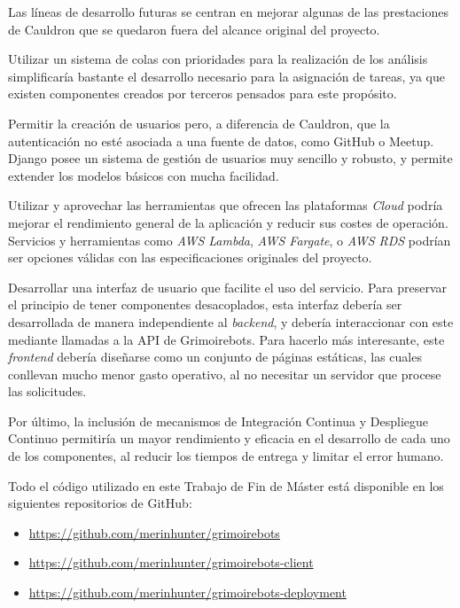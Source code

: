 Las líneas de desarrollo futuras se centran en mejorar algunas de las prestaciones de Cauldron que se quedaron fuera del alcance original del proyecto.

Utilizar un sistema de colas con prioridades para la realización de los análisis simplificaría bastante el desarrollo necesario para la asignación de tareas, ya que existen componentes creados por terceros pensados para este propósito.

Permitir la creación de usuarios pero, a diferencia de Cauldron, que la autenticación no esté asociada a una fuente de datos, como GitHub o Meetup. Django posee un sistema de gestión de usuarios muy sencillo y robusto, y permite extender los modelos básicos con mucha facilidad.

Utilizar y aprovechar las herramientas que ofrecen las plataformas \emph{Cloud} podría mejorar el rendimiento general de la aplicación y reducir sus costes de operación. Servicios y herramientas como \emph{AWS Lambda}, \emph{AWS Fargate}, o \emph{AWS RDS} podrían ser opciones válidas con las especificaciones originales del proyecto.

Desarrollar una interfaz de usuario que facilite el uso del servicio. Para preservar el principio de tener componentes desacoplados, esta interfaz debería ser desarrollada de manera independiente al \emph{backend}, y debería interaccionar con este mediante llamadas a la API\index{} de Grimoirebots. Para hacerlo más interesante, este \emph{frontend} debería diseñarse como un conjunto de páginas estáticas, las cuales conllevan mucho menor gasto operativo, al no necesitar un servidor que procese las solicitudes.

Por último, la inclusión de mecanismos de Integración Continua y Despliegue Continuo permitiría un mayor rendimiento y eficacia en el desarrollo de cada uno de los componentes, al reducir los tiempos de entrega y limitar el error humano.

Todo el código utilizado en este Trabajo de Fin de Máster está disponible en los siguientes repositorios de GitHub:

\begin{itemize}
    \item \url{https://github.com/merinhunter/grimoirebots}
    \item \url{https://github.com/merinhunter/grimoirebots-client}
    \item \url{https://github.com/merinhunter/grimoirebots-deployment}
\end{itemize}
